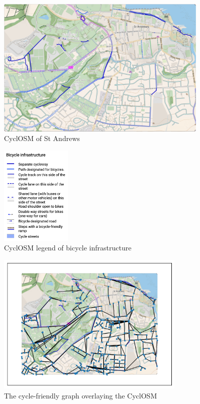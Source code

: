 \documentclass[12pt,a4paper]{report}
\begin{document}
\begin{figure}[ht!]
    \centering
    \includegraphics[width=0.9\textwidth]{diss_images/eval/cyclosm_st_andrews.png}
    \caption{CyclOSM of St Andrews}
    \label{fig:cyclosm st andrews}
\end{figure}

\begin{figure}[ht!]
    \centering
    \includegraphics[width=0.3\textwidth]{diss_images/eval/cyclosm_legend.png}
    \caption{CyclOSM legend of bicycle infrastructure}
    \label{fig:cyclosm legend}
\end{figure}

\begin{figure}[ht]
    \centering
    \includegraphics[width=0.8\textwidth,trim={1cm 1cm 1cm 1cm},clip]{diss_images/eval/overlay_st_andrews.png}
    \caption{The cycle-friendly graph overlaying the CyclOSM}
    \label{fig:overlay st andrews}
\end{figure}
\end{document}
